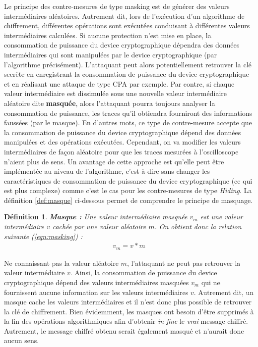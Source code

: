 \documentclass[oneside]{book}
\newtheorem{definition}{Définition}[section]
\begin{document}
Le principe des contre-mesures de type masking \cite{mangard_power_2007} est de générer des valeurs intermédiaires aléatoires. Autrement dit, lors de l'exécution d'un algorithme de chiffrement, différentes opérations sont exécutées conduisant à différentes valeurs intermédiaires calculées. Si aucune protection n'est mise en place, la consommation de puissance du device cryptographique dépendra des données intermédiaires qui sont manipulées par le device cryptographique (par l'algorithme précisément). L'attaquant peut alors potentiellement retrouver la clé secrète en enregistrant la consommation de puissance du device cryptographique et en réalisant une attaque de type CPA par exemple. Par contre, si chaque valeur intermédiaire est dissimulée sous une nouvelle valeur intermédiaire aléatoire dite \textbf{masquée}, alors l'attaquant pourra toujours analyser la consommation de puissance, les traces qu'il obtiendra fourniront des informations faussées (par le masque). En d'autres mots, ce type de contre-mesure accepte que la consommation de puissance du device cryptographique dépend des données manipulées et des opérations exécutées. Cependant, on va modifier les valeurs intermédiaires de façon aléatoire pour que les traces mesurées à l'oscilloscope n'aient plus de sens. Un avantage de cette approche est qu'elle peut être implémentée au niveau de l'algorithme, c'est-à-dire sans changer les caractéristiques de consommation de puissance du device cryptographique (ce qui est plus complexe) comme c'est le cas pour les contre-mesures de type \textit{Hiding}. La définition \ref{def:masque} ci-dessous permet de comprendre le principe de masquage. 

\theoremstyle{definition}
\begin{definition}{\textbf{Masque :}}
Une valeur intermédiaire masquée $v_m$ est une valeur intermédiaire $v$ cachée par une valeur aléatoire $m$. On obtient donc la relation suivante (\ref{eqn:masking}) : 
\begin{gather}
	v_m = v * m\label{eqn:masking}
\end{gather}
\end{definition}
\label{def:masque}

\hspace{-0.5cm}Ne connaissant pas la valeur aléatoire $m$, l'attaquant ne peut pas retrouver la valeur intermédiaire $v$. Ainsi, la consommation de puissance du device cryptographique dépend des valeurs intermédiaires masquées $v_m$ qui ne fournissent aucune information sur les valeurs intermédiaires $v$. Autrement dit, un masque cache les valeurs intermédiaires et il n'est donc plus possible de retrouver la clé de chiffrement. Bien évidemment, les masques ont besoin d'être supprimés à la fin des opérations algorithmiques afin d'obtenir \textit{in fine} le \textit{vrai} message chiffré. Autrement, le message chiffré obtenu serait également masqué et n'aurait donc aucun sens.
\end{document}
